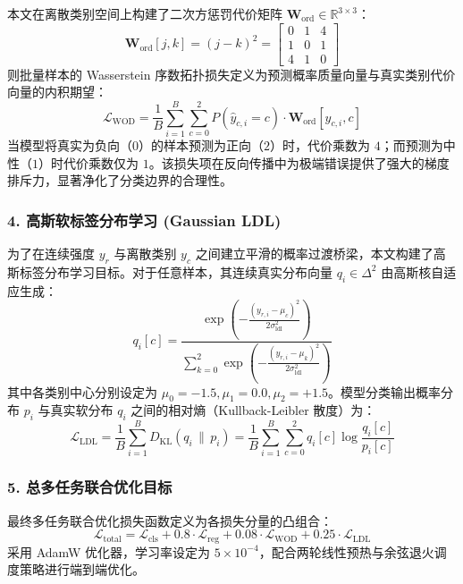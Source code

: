 本文在离散类别空间上构建了二次方惩罚代价矩阵 $\mathbf{W}_{\text{ord}} \in \mathbb{R}^{3 \times 3}$：
\begin{equation}
\mathbf{W}_{\text{ord}}[j, k] = (j - k)^2 = \begin{bmatrix}
0 & 1 & 4 \\
1 & 0 & 1 \\
4 & 1 & 0
\end{bmatrix}
\end{equation}
则批量样本的 Wasserstein 序数拓扑损失定义为预测概率质量向量与真实类别代价向量的内积期望：
\begin{equation}
\mathcal{L}_{\text{WOD}} = \frac{1}{B} \sum_{i=1}^B \sum_{c=0}^2 P(\hat{y}_{c,i} = c) \cdot \mathbf{W}_{\text{ord}}[y_{c,i}, c]
\end{equation}
当模型将真实为负向（$0$）的样本预测为正向（$2$）时，代价乘数为 $4$；而预测为中性（$1$）时代价乘数仅为 $1$。该损失项在反向传播中为极端错误提供了强大的梯度排斥力，显著净化了分类边界的合理性。

\subsubsection{4. 高斯软标签分布学习 (Gaussian LDL)}
为了在连续强度 $y_r$ 与离散类别 $y_c$ 之间建立平滑的概率过渡桥梁，本文构建了高斯标签分布学习目标。对于任意样本，其连续真实分布向量 $q_i \in \Delta^2$ 由高斯核自适应生成：
\begin{equation}
q_i[c] = \frac{\exp\left( -\frac{(y_{r,i} - \mu_c)^2}{2 \sigma_{\text{ldl}}^2} \right)}{\sum_{k=0}^2 \exp\left( -\frac{(y_{r,i} - \mu_k)^2}{2 \sigma_{\text{ldl}}^2} \right)}
\end{equation}
其中各类别中心分别设定为 $\mu_0 = -1.5, \mu_1 = 0.0, \mu_2 = +1.5$。模型分类输出概率分布 $p_i$ 与真实软分布 $q_i$ 之间的相对熵（Kullback-Leibler 散度）为：
\begin{equation}
\mathcal{L}_{\text{LDL}} = \frac{1}{B} \sum_{i=1}^B D_{\text{KL}}(q_i \,\|\, p_i) = \frac{1}{B} \sum_{i=1}^B \sum_{c=0}^2 q_i[c] \log \frac{q_i[c]}{p_i[c]}
\end{equation}

\subsubsection{5. 总多任务联合优化目标}
最终多任务联合优化损失函数定义为各损失分量的凸组合：
\begin{equation}
\mathcal{L}_{\text{total}} = \mathcal{L}_{\text{cls}} + 0.8 \cdot \mathcal{L}_{\text{reg}} + 0.08 \cdot \mathcal{L}_{\text{WOD}} + 0.25 \cdot \mathcal{L}_{\text{LDL}}
\end{equation}
采用 AdamW 优化器，学习率设定为 $5 \times 10^{-4}$，配合两轮线性预热与余弦退火调度策略进行端到端优化。

